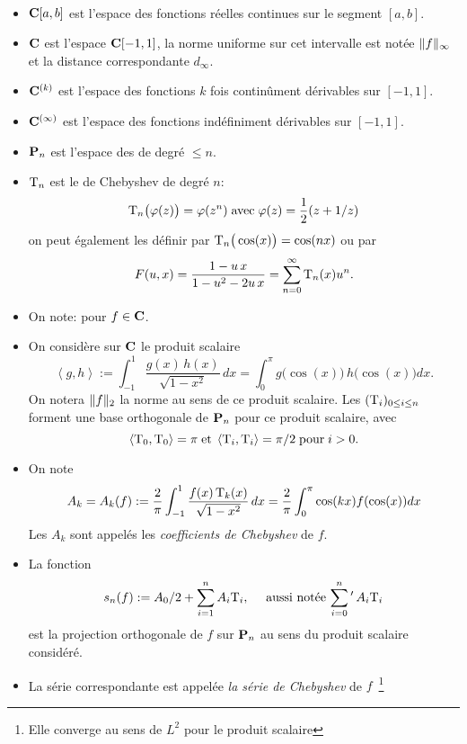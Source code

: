 \begin{fnotation} \label{f521} ~ 
\begin{itemize}\itemsep2pt
\item  ${{\bf C}[a,b]}$ est l'espace des fonctions réelles continues sur le segment 
$[a,b]$.
\item  
${\bf C}$ est l'espace  ${{\bf C}[-1,1]}$,  la norme uniforme sur cet intervalle est notée  
$\lVert  f  \rVert_{\infty}$   et  la distance correspondante $d_{\infty}$. 
\item   
${\bf C}^{(k)}$  est l'espace des fonctions $k$ fois continûment dérivables sur 
$[-1,1]$. 
%
\item  
${\bf C}^{(\infty)}$  est l'espace des fonctions  indéfiniment dérivables sur  $[-1,1]$.  
%
\item  
${\bf P}_n$ est l'espace des \pols de degré  $\leq n$.  
%
\item  
${\rm T}_n$  est le \pol de Chebyshev de degré $n$:  
\[
{\rm T}_n\big(\varphi (z)\big)= \varphi(z^n) \; \hbox{avec} \; \varphi(z) = \frac {1} {2} (z 
+ 1/z)
\]
on peut également les définir par    ${\rm T}_n\big(\cos (x)\big) = \cos (nx)$    ou par  
\[
F(u,x) = \frac {1-u\,x} {1-u^2-2u\,x} = \sum_{n=0}^{\infty} {\rm T}_n(x)u^n.
\]
%
\item  
On note:     pour  $f \in {\bf C}$.    
%
\item  On considère   sur ${\bf C}$  le produit scalaire  
\[
\left < g,h \right > := \int_{-1}^1 \frac {g(x)\,h(x)} {\sqrt {1-x^2}}\, dx 
= \int_0^{\pi} g\big(\cos (x)\big)\,h \big(\cos (x)\big)dx. 
\]
On notera  $\lVert  f  \rVert_2$  la norme au sens de ce produit scalaire.  
Les \pols  $({\rm T}_i)_{0 \leq i \leq n}$   forment une base orthogonale de  
${\bf P}_n$   pour ce produit scalaire, avec  
\[
\left < {\rm T}_0,{\rm T}_0 \right > = \pi \; \hbox{et} \; \left < {\rm T}_i,{\rm T}_i \right > = 
\pi /2 \; \hbox{pour} \; i>0.
\]
\item  On note
\[
A_k = A_k(f):= \frac {2} {\pi} \int_{-1}^{1}  \frac {f(x)\,{\rm T}_k(x)} {\sqrt {1-x^2}}\, {dx}= \frac {2} {\pi} \int_{0}^{\pi} \cos (kx) f(\cos (x))dx
\]
Les  $A_k$  sont appelés les  {\em coefficients de Chebyshev}  de  $f$.
\item  La fonction 
\[
s_n(f) := A_0/2 + \sum_{i=1}^{n}A_i{\rm T}_i, \quad   \hbox{ aussi notée } 
 {\sum_{i=0}^n}\,'\, A_i{\rm T}_i
\]  
est la projection orthogonale de $f$ sur ${\bf P}_n$ au sens du produit scalaire considéré.    
\item  
La série correspondante est appelée  {\em la série de Chebyshev}  de 
$f$~{\footnote{Elle converge au sens de  $L^2$  pour le produit scalaire 
}}
\end{itemize}
\end{fnotation}
